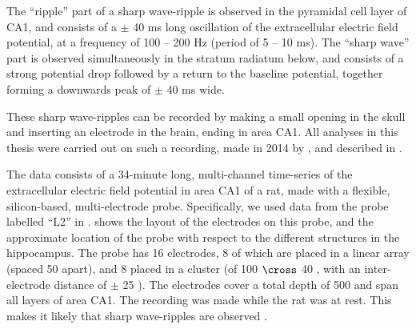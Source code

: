 The ``ripple'' part of a sharp wave-ripple is observed in the pyramidal cell layer of CA1, and consists of a $\pm$ 40 ms long oscillation of the extracellular electric field potential, at a frequency of 100 -- 200 Hz (period of 5 -- 10 ms). The ``sharp wave'' part is observed simultaneously in the stratum radiatum below, and consists of a strong potential drop followed by a return to the baseline potential, together forming a downwards peak of $\pm$ 40 ms wide.




These sharp wave-ripples can be recorded by making a small opening in the skull and inserting an electrode in the brain, ending in area CA1. All analyses in this thesis were carried out on such a recording, made in 2014 by \citeauthor*{Michon2016}, and described in .

The data consists of a 34-minute long, multi-channel time-series of the extracellular electric field potential in area CA1 of a rat, made with a flexible, silicon-based, multi-electrode probe. Specifically, we used data from the probe labelled ``L2'' in \cite{Michon2016}.  shows the layout of the electrodes on this probe, and the approximate location of the probe with respect to the different structures in the hippocampus. The probe has 16 electrodes, 8 of which are placed in a linear array (spaced 50 \um{} apart), and 8 placed in a cluster (of 100 \um{} $\cross$ 40 \um{}, with an inter-electrode distance of $\pm$ 25 \um{}). The electrodes cover a total depth of 500 \um{} and span all layers of area CA1.
The recording was made while the rat was at rest. This makes it likely that  sharp wave-ripples are observed \cite{Buzsaki2015}. 




